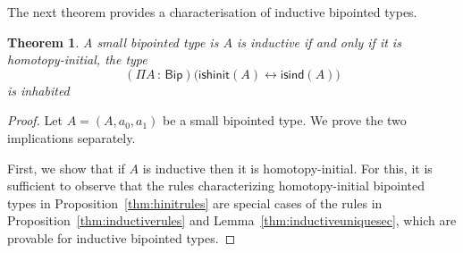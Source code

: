 \documentclass[10pt,a4paper,oneside,reqno]{amsart}
\numberwithin{equation}{section}
\theoremstyle{mythm}
\newtheorem{theorem}{Theorem}[section]
\theoremstyle{mydef}
\theoremstyle{myrmk}
\newcommand{\ie}{\text{i.e.\ }}
\newcommand{\co}{\,{:}\,}
\newcommand{\isbipind}{\mathsf{isind}}
\newcommand{\isbiphinit}{\mathsf{ishinit}}
\newcommand{\Bip}{\mathsf{Bip}}
\begin{document}
The next theorem provides a characterisation of inductive bipointed types.






\begin{theorem}\label{thm:bipointedmain} A small bipointed type 
is  $A$ is inductive if and only if it is homotopy-initial, \ie  the type
\[
(\Pi A \co \Bip) \big(  \isbiphinit(A) \leftrightarrow \isbipind(A) \big)
\] 
is inhabited
\end{theorem}

\begin{proof} Let $A = (A, a_0, a_1)$ be a small bipointed type. We prove the two 
implications separately. 

First, we show that if $A$ is inductive then
it is homotopy-initial. For this, it is sufficient to 
observe that the rules characterizing homotopy-initial bipointed types in Proposition~\ref{thm:hinitrules}
are special cases of the rules in Proposition~\ref{thm:inductiverules} and Lemma~\ref{thm:inductiveuniquesec},
which are provable for inductive bipointed types. 


\end{proof}
\end{document}

